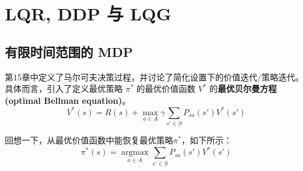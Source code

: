 \chapter{LQR, DDP 与 LQG}

\section{有限时间范围的 MDP}\label{sec:16.1}

第15章中定义了马尔可夫决策过程，并讨论了简化设置下的价值迭代/策略迭代。具体而言，引入了定义最优策略 $\pi^*$ 的最优价值函数 $V^*$ 的\textbf{最优贝尔曼方程 (optimal Bellman equation)}。
\[
    V^*(s) = R(s) + \max_{a \in A}\gamma \sum_{s' \in S} P_{sa}(s')V^*(s')
\]

回想一下，从最优价值函数中能恢复最优策略$\pi^*$，如下所示：
\[
    \pi^*(s) = \operatorname*{argmax}_{a \in A} \sum_{s' \in S} P_{sa}(s')V^*(s')
\]

